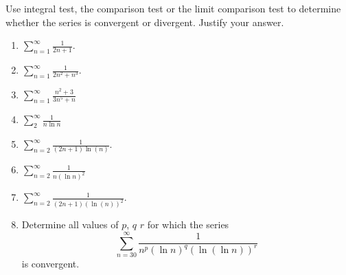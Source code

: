 Use integral test, the comparison test or the limit comparison test to determine whether the series is convergent or divergent. Justify your answer.
\begin{multicols}{2}
\begin{enumerate}
\item 
$\displaystyle \sum\limits_{n=1}^{\infty} \frac{1}{2n+1}$.

\item 
$\displaystyle \sum\limits_{n=1}^{\infty} \frac{1}{2n^2+n^3}$.

\item $\displaystyle \sum\limits_{n=1}^{\infty}\frac{n^2+3}{3n^5+n}$

\item \label{problemConvergencesum_2^infty1/(xlnx)dx}
$\displaystyle \sum_{2}^\infty \frac{1}{n \ln n}$

\item 
$\displaystyle \sum\limits_{n=2}^{\infty} \frac{1}{(2n+1)\ln (n)}$.

\item $\displaystyle \sum\limits_{n=2}^{\infty}\frac{1}{n(\ln n)^2}$

\item 
$\displaystyle \sum\limits_{n=2}^{\infty} \frac{1}{(2n+1)(\ln (n))^2}$.

\item 
Determine all values of $p$, $q$ $r$ for which the series 
\[
\displaystyle \sum_{n=30}^{\infty} \frac{1}{n^p(\ln n)^q(\ln (\ln n))^r}
\]
is convergent.


\end{enumerate}
\end{multicols}

